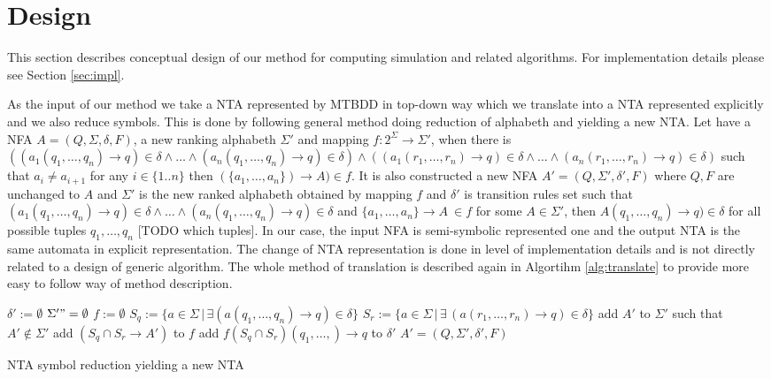 \documentclass[a4paper, 12pt]{article}
\begin{document}
\section{Design}
\label{sec:design}

This section describes conceptual design of our method for computing simulation and related algorithms.
For implementation details please see Section \ref{sec:impl}.

As the input of our method we take a NTA represented by MTBDD in top-down way
which we translate into a NTA represented explicitly and we also reduce symbols.
This is done by following general method doing reduction of alphabeth and yielding a new NTA.
Let have a NFA $A=(Q, \Sigma, \delta, F)$, a new ranking alphabeth $\Sigma'$ and mapping $f: 2^\Sigma \rightarrow \Sigma'$,
when there is $((a_1(q_1,\ldots,q_n) \rightarrow q) \in \delta \wedge \ldots \wedge (a_n(q_1,\ldots,q_n) \rightarrow q) \in \delta) \wedge
((a_1(r_1,\ldots,r_n) \rightarrow q) \in \delta \wedge \ldots \wedge (a_n(r_1,\ldots,r_n) \rightarrow q) \in \delta)$
such that $a_i \neq a_{i+1}$ for any $i\in \{1..n\}$ then $(\{a_1, \ldots, a_n\}) \rightarrow A) \in f$.
It is also constructed a new NFA $A' = (Q, \Sigma', \delta', F)$ where $Q, F$ are unchanged to $A$ 
and $\Sigma'$ is the new ranked alphabeth obtained by mapping $f$ and $\delta'$ is transition rules set such that
$(a_1(q_1, \ldots, q_n) \rightarrow q) \in \delta \wedge \ldots \wedge (a_n(q_1, \ldots, q_n) \rightarrow q) \in \delta$ and
$ \{a_1,\ldots,a_n\}  \rightarrow A~\in f$ for some $A \in \Sigma'$, then $A(q_1, \ldots, q_n) \rightarrow q) \in \delta$
for all possible tuples $q_1,\ldots,q_n$ [TODO which tuples].
In our case, the input NFA is semi-symbolic represented one and the output NTA is the same automata in explicit representation.
The change of NTA representation is done in level of implementation details and is not directly related to a design of generic algorithm.
The whole method of translation is described again in Algortihm \ref{alg:translate} to provide more easy to follow way of method description.

\begin{algorithm}[h]
\label{alg:translate}
    $\delta' := \emptyset $\;
    $\Sigma' "= \emptyset $\;
	$f := \emptyset$\;
    {
		{
			$S_q := \{ a\in \Sigma \,|\, \exists(a(q_1,\ldots,q_n) \rightarrow q) \in \delta\}$\;
			{
				$S_r := \{a\in \Sigma \,|\, \exists\, (a(r_1,\ldots,r_n) \rightarrow q) \in \delta\}$\;
				{
					add $A'$ to $\Sigma'$ such that $A' \not\in \Sigma'$\;
					add $(S_q \cap S_r \rightarrow A')$ to $f$\;
				}
				add $f(S_q \cap S_r)(q_1,\ldots,) \rightarrow q$ to $\delta'$\;
			}
		}
    }
	\Return $A' = (Q, \Sigma', \delta', F)$
\caption{NTA symbol reduction yielding a new NTA}
\end{algorithm}
\end{document}
